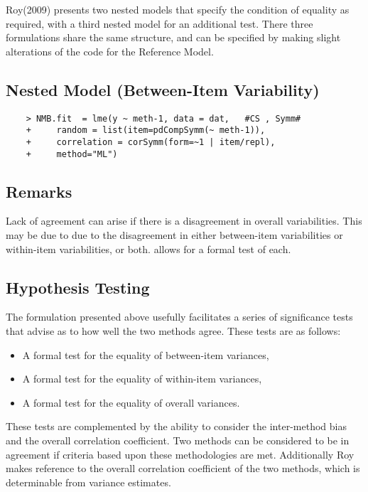 \documentclass[12pt, a4paper]{report}
\theoremstyle{plain}
\theoremstyle{definition}
\theoremstyle{remark}
\begin{document}
Roy(2009) presents two nested models that specify the condition of equality as required, with a third nested model for an additional test. There three formulations share the same structure, and can be specified by making slight alterations of the code for the Reference Model.

\subsection{Nested Model (Between-Item Variability)}
\begin{framed}
	\begin{verbatim}
	> NMB.fit  = lme(y ~ meth-1, data = dat,   #CS , Symm#
	+     random = list(item=pdCompSymm(~ meth-1)),
	+     correlation = corSymm(form=~1 | item/repl), 
	+     method="ML")
	\end{verbatim}
\end{framed}

\newpage


\newpage


\subsection{Remarks}
Lack of agreement can arise if there is a disagreement in overall variabilities. This may be due to due to the disagreement in either between-item
variabilities or within-item variabilities, or both. \citet{roy} allows for a formal test of each.

\subsection{Hypothesis Testing}
The formulation presented above usefully facilitates a series of
significance tests that advise as to how well the two methods
agree. These tests are as follows:
\begin{itemize}
	\item A formal test for the equality of between-item variances,
	\item A formal test for the equality of within-item variances,
	\item A formal test for the equality of overall variances.
\end{itemize}
These tests are complemented by the ability to consider the inter-method bias and the overall correlation coefficient. Two methods can be considered to be in agreement if criteria based upon these methodologies are met. Additionally Roy makes reference to the overall correlation coefficient of the two methods, which is determinable from variance estimates.
\end{document}
